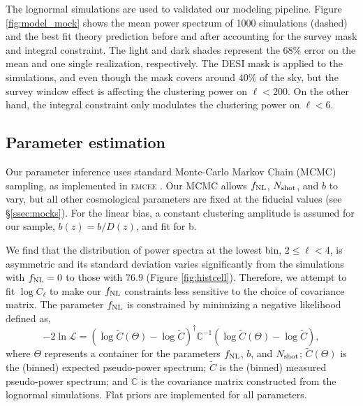 The lognormal simulations are used to validated our modeling pipeline. Figure \ref{fig:model_mock} shows the mean power spectrum of 1000 simulations (dashed) and the best fit theory prediction before and after accounting for the survey mask and integral constraint. The light and dark shades represent the 68\% error on the mean and one single realization, respectively. The DESI mask is applied to the simulations, and even though the mask covers around $40\%$ of the sky, but the survey window effect is affecting the clustering power on $\ell < 200$. On the other hand, the integral constraint only modulates the clustering power on $\ell < 6$.

\subsection{Parameter estimation}
Our parameter inference uses standard Monte-Carlo Markov Chain (MCMC) sampling, as implemented in \textsc{emcee} \citep{2013PASP..125..306F}. Our MCMC allows $f_{\rm NL}$, $N_{\rm shot}$, and $b$ to vary, but all other cosmological parameters are fixed at the fiducial values (see \S \ref{ssec:mocks}). For the linear bias, a constant clustering amplitude is assumed for our sample, $b(z) = b/D(z)$, and fit for b.  

We find that the distribution of power spectra at the lowest bin, $2\leq \ell < 4$, is asymmetric and its standard deviation varies significantly from the simulations with $f_{\rm NL}=0$ to those with $76.9$ (Figure \ref{fig:histcell}). Therefore, we attempt to fit $\log C_{\ell}$ to make our $f_{\rm NL}$ constraints less sensitive to the choice of covariance matrix. The parameter $f_{\rm NL}$ is constrained by minimizing a negative likelihood defined as,
\begin{equation}
-2\ln\mathcal{L} = (\log \tilde{C}(\Theta)-\log \tilde{C})^{\dagger} \mathbb{C}^{-1} (\log \tilde{C}(\Theta)-\log \tilde{C}),
\end{equation}
where $\Theta$ represents a container for the parameters $f_{\rm NL}$, $b$, and $N_{\rm shot}$; $\tilde{C}(\Theta)$ is the (binned) expected pseudo-power spectrum; $\tilde{C}$ is the (binned) measured pseudo-power spectrum; and $\mathbb{C}$ is the covariance matrix constructed from the lognormal simulations. Flat priors are implemented for all parameters.

